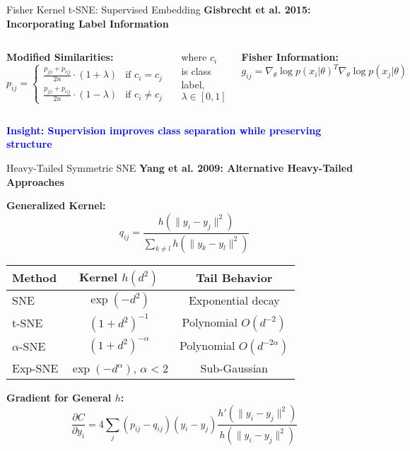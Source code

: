 \documentclass[aspectratio=169]{beamer}
\newcommand{\conceptbox}[2]{\colorbox{#1!20}{\textcolor{#1}{\textbf{#2}}}}
\newcommand{\insight}[1]{\conceptbox{blue}{Insight: #1}}
\begin{document}
\begin{frame}{Fisher Kernel t-SNE: Supervised Embedding}
\textbf{Gisbrecht et al. 2015: Incorporating Label Information}

\begin{columns}
\textbf{Modified Similarities:}
$$p_{ij} = \begin{cases}
\frac{p_{j|i} + p_{i|j}}{2n} \cdot (1 + \lambda) & \text{if } c_i = c_j \\
\frac{p_{j|i} + p_{i|j}}{2n} \cdot (1 - \lambda) & \text{if } c_i \neq c_j
\end{cases}$$

where $c_i$ is class label, $\lambda \in [0,1]$

\textbf{Fisher Information:}
$$g_{ij} = \nabla_\theta \log p(x_i|\theta)^T \nabla_\theta \log p(x_j|\theta)$$

\begin{center}
\end{center}
\end{columns}

\insight{Supervision improves class separation while preserving structure}
\end{frame}

\begin{frame}{Heavy-Tailed Symmetric SNE}
\textbf{Yang et al. 2009: Alternative Heavy-Tailed Approaches}

\textbf{Generalized Kernel:}
$$q_{ij} = \frac{h(\|y_i - y_j\|^2)}{\sum_{k \neq l} h(\|y_k - y_l\|^2)}$$

\begin{center}
\begin{tabular}{l|c|c}
\textbf{Method} & \textbf{Kernel $h(d^2)$} & \textbf{Tail Behavior} \\
\hline
SNE & $\exp(-d^2)$ & Exponential decay \\
t-SNE & $(1 + d^2)^{-1}$ & Polynomial $O(d^{-2})$ \\
$\alpha$-SNE & $(1 + d^2)^{-\alpha}$ & Polynomial $O(d^{-2\alpha})$ \\
Exp-SNE & $\exp(-d^\alpha)$, $\alpha < 2$ & Sub-Gaussian \\
\end{tabular}
\end{center}

\textbf{Gradient for General $h$:}
$$\frac{\partial C}{\partial y_i} = 4\sum_j (p_{ij} - q_{ij})(y_i - y_j)\frac{h'(\|y_i - y_j\|^2)}{h(\|y_i - y_j\|^2)}$$
\end{frame}
\end{document}

